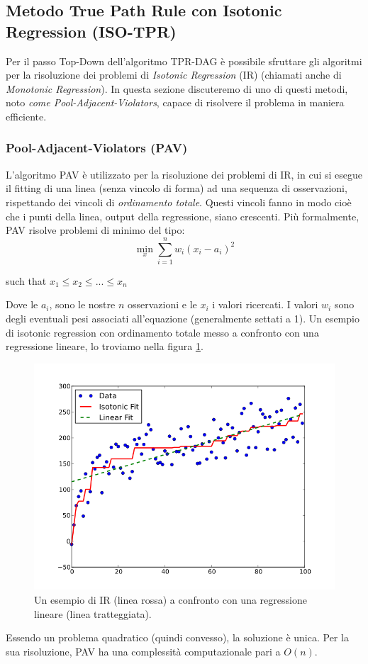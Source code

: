 \documentclass[12pt]{report}
\begin{document}
\subsection{Metodo True Path Rule con Isotonic Regression (ISO-TPR)}
Per il passo Top-Down dell'algoritmo TPR-DAG è possibile sfruttare gli algoritmi per la risoluzione dei problemi di \emph{Isotonic Regression} (IR) (chiamati anche di \emph{Monotonic Regression}). In questa sezione discuteremo di uno di questi metodi, noto \emph{come Pool-Adjacent-Violators}, capace di risolvere il problema in maniera efficiente.

\subsubsection{Pool-Adjacent-Violators (PAV)}
L'algoritmo PAV è utilizzato per la risoluzione dei problemi di IR, in cui si esegue il fitting di una linea (senza vincolo di forma) ad una sequenza di osservazioni, rispettando dei vincoli di \emph{ordinamento totale}. Questi vincoli fanno in modo cioè che i punti della linea, output della regressione, siano crescenti. Più formalmente, PAV risolve problemi di minimo del tipo:
\[
\min_x \sum_{i=1}^{n} w_i (x_i - a_i)^2
\]
\begin{center}
such that $x_1 \le x_2 \le ... \le x_n$ 
\end{center}
Dove le $a_i$, sono le nostre $n$ osservazioni e le $x_i$ i valori ricercati. I valori $w_i$ sono degli eventuali pesi associati all'equazione (generalmente settati a 1).
\newline
\newline
Un esempio di isotonic regression con ordinamento totale messo a confronto con una regressione lineare\cite{wikimonotonic}, lo troviamo nella figura \ref{isotonic}.
\begin{figure}[h]
\centering
\includegraphics[scale=0.35]{./images/monotonic.png}
\caption{\footnotesize{Un esempio di IR (linea rossa)  a confronto con una regressione lineare (linea tratteggiata).}}
\label{isotonic}
\end{figure}
\newline
\newline
Essendo un problema quadratico (quindi convesso), la soluzione è unica. Per la sua risoluzione, PAV ha una complessità computazionale pari a $O(n)$. 
\end{document}
